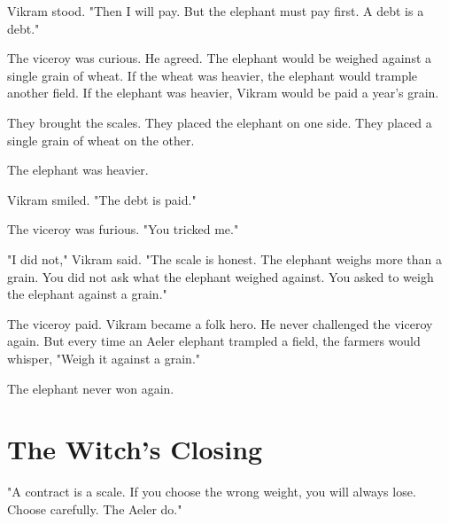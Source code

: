 \documentclass[10pt,twoside]{book}
\begin{document}
Vikram stood. "Then I will pay. But the elephant must pay first. A debt is a debt."

The viceroy was curious. He agreed. The elephant would be weighed against a single grain of wheat. If the wheat was heavier, the elephant would trample another field. If the elephant was heavier, Vikram would be paid a year's grain.

They brought the scales. They placed the elephant on one side. They placed a single grain of wheat on the other.

The elephant was heavier.

Vikram smiled. "The debt is paid."

The viceroy was furious. "You tricked me."

"I did not," Vikram said. "The scale is honest. The elephant weighs more than a grain. You did not ask what the elephant weighed against. You asked to weigh the elephant against a grain."

The viceroy paid. Vikram became a folk hero. He never challenged the viceroy again. But every time an Aeler elephant trampled a field, the farmers would whisper, "Weigh it against a grain."

The elephant never won again.

\section*{The Witch's Closing}
"A contract is a scale. If you choose the wrong weight, you will always lose. Choose carefully. The Aeler do."
\end{document}
